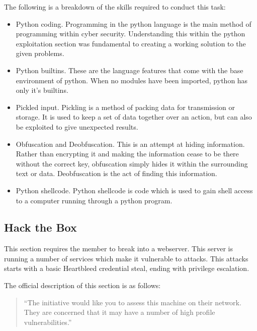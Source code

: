\documentclass[a4paper,11pt]{report}
\begin{document}
			The following is a breakdown of the skills required to conduct this task:
			\begin{itemize}
				\item Python coding.
					Programming in the python language is the main method of programming within cyber security. 
					Understanding this within the python exploitation section was fundamental to creating a working solution to the given problems. 
				\item Python builtins. 
					These are the language features that come with the base environment of python. 
					When no modules have been imported, python has only it's builtins. 
				\item Pickled input. 
					Pickling is a method of packing data for transmission or storage. 
					It is used to keep a set of data together over an action, but can also be exploited to give unexpected results. 
				\item Obfuscation and Deobfuscation. 
					This is an attempt at hiding information. 
					Rather than encrypting it and making the information cease to be there without the correct key, obfuscation simply hides it within the surrounding text or data. 
					Deobfuscation is the act of finding this information.
				\item Python shellcode. 
					Python shellcode is code which is used to gain shell access to a computer running through a python program. 
			\end{itemize}

		\subsection{Hack the Box}
			This section requires the member to break into a webserver. 
			This server is running a number of services which make it vulnerable to attacks. 
			This attacks starts with a basic Heartbleed credential steal, ending with privilege escalation. 

			The official description of this section is as follows:
			\begin{quote}
				``The initiative would like you to assess this machine on their network. They are concerned that it may have a number of high profile vulnerabilities.''
			\end{quote}
\end{document}
